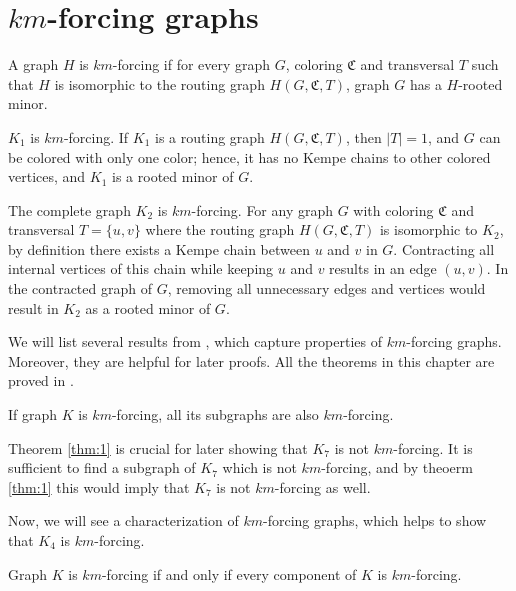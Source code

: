 \section{$km$-forcing graphs}

\begin{defn}[$km$-forcing]
 A graph $H$ is $km$-forcing if for every graph $G$, coloring $\mathfrak{C}$ and transversal $T$
 such that $H$ is isomorphic to the routing graph $H(G, \mathfrak{C}, T)$, graph $G$ has a $H$-rooted minor.
\end{defn}

\begin{example}
    $K_1$ is $km$-forcing. If $K_1$ is a routing graph $H(G, \mathfrak{C}, T)$, then $|T| = 1$, and $G$
can be colored with only one color; hence, it has no Kempe chains to other colored vertices, and $K_1$ is a rooted minor of $G$.
\end{example}

\begin{example}
 The complete graph $K_2$ is $km$-forcing. 
 For any graph $G$ with coloring $\mathfrak{C}$ and transversal $T = \{u,v\}$ where the routing graph $H(G, \mathfrak{C}, T)$ is
 isomorphic to $K_2$, by definition there exists a Kempe chain between $u$ and $v$ in $G$. 
 Contracting all internal vertices of this chain while keeping $u$ and $v$ results in an edge $(u, v)$. In the contracted graph of $G$,
 removing all unnecessary edges and vertices would result in $K_2$ as a rooted minor of $G$.
\end{example}

We will list several results from \cite{matthias_2022}, which capture properties of $km$-forcing graphs. Moreover, they are helpful 
for later proofs. All the theorems in this chapter are proved in \cite{matthias_2022}.

\begin{thm}
\label{thm:1}
 If graph $K$ is $km$-forcing, all its subgraphs are also $km$-forcing.
\end{thm}

Theorem \ref{thm:1} is crucial for later showing that $K_7$ is not $km$-forcing. It is sufficient to find a subgraph 
of $K_7$ which is not $km$-forcing, and by theoerm \ref{thm:1} this would imply that $K_7$ is not $km$-forcing as well.

Now, we will see a characterization of $km$-forcing graphs, which helps to show that $K_4$ is $km$-forcing.

\begin{thm}
\label{thm:1.5}
 Graph $K$ is $km$-forcing if and only if every component of $K$ is $km$-forcing.
\end{thm}

